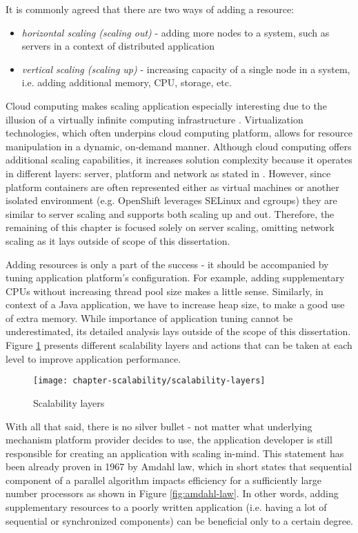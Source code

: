 It is commonly agreed that there are two ways of adding a resource:
\begin{itemize}
	\item \textit{horizontal scaling (scaling out)} - adding more nodes to a system, such as servers in a context of distributed application
	\item \textit{vertical scaling (scaling up)} - increasing capacity of a single node in a system, i.e. adding additional memory, CPU, storage, etc.
\end{itemize}

Cloud computing makes scaling application especially interesting due to the illusion of a virtually infinite computing infrastructure \cite{VaRoBu11}. Virtualization technologies, which often underpins cloud computing platform, allows for resource manipulation in a dynamic, on-demand manner. Although cloud computing offers additional scaling capabilities, it increases solution complexity because it operates in different layers: server, platform and network as stated in \cite{VaRoBu11}. However, since platform containers are often represented either as virtual machines or another isolated environment (e.g. OpenShift leverages SELinux and cgroups) they are similar to server scaling and supports both scaling up and out. Therefore, the remaining of this chapter is focused solely on server scaling, omitting network scaling as it lays outside of scope of this dissertation.

Adding resources is only a part of the success - it should be accompanied by tuning application platform's configuration. For example, adding supplementary CPUs without increasing thread pool size makes a little sense. Similarly, in context of a Java application, we have to increase heap size, to make a good use of extra memory. While importance of application tuning cannot be underestimated, its detailed analysis lays outside of the scope of this dissertation. Figure \ref{fig:scalability-layers} presents different scalability layers and actions that can be taken at each level to improve application performance.

\begin{figure}[!ht]
  \begin{center}
    \texttt{[image: chapter-scalability/scalability-layers]}
  \end{center}
  \caption{Scalability layers}
  \label{fig:scalability-layers}
\end{figure}

With all that said, there is no silver bullet - not matter what underlying mechanism platform provider decides to use, the application developer is still responsible for creating an application with scaling in-mind. This statement has been already proven in 1967 by Amdahl law, which in short states that sequential component of a parallel algorithm impacts efficiency for a sufficiently large number processors \cite{Am67} as shown in Figure \ref{fig:amdahl-law}. In other words, adding supplementary resources to a poorly written application (i.e. having a lot of sequential or synchronized components) can be beneficial only to a certain degree. 

